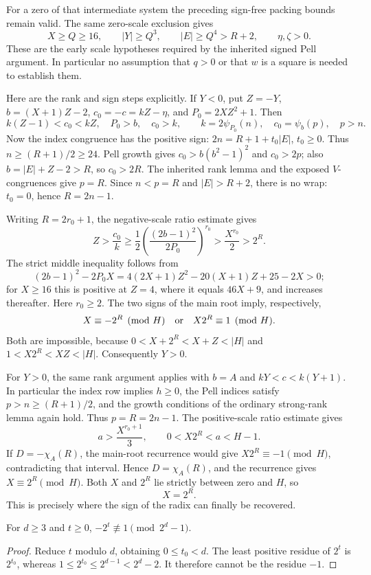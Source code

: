 For a zero of that intermediate system the preceding sign-free packing
bounds remain valid.  The same zero-scale exclusion gives
\[
 X\geq Q\geq16,\qquad |Y|\geq Q^3,\qquad
 |E|\geq Q^4>R+2,\qquad \eta,\zeta>0.
\]
These are the early scale hypotheses required by the inherited signed
Pell argument.  In particular no assumption that \(q>0\) or that
\(w\) is a square is needed to establish them.

Here are the rank and sign steps explicitly.  If \(Y<0\), put
\(Z=-Y\), \(b=(X+1)Z-2\), \(c_0=-c=kZ-\eta\), and
\(P_0=2XZ^2+1\).  Then
\[
 k(Z-1)<c_0<kZ,\quad P_0>b,\quad c_0>k,\qquad
 k=2\psi_{P_0}(n),\quad c_0=\psi_b(p),\quad p>n.
\]
Now the index congruence has the positive sign:
\(2n=R+1+t_0|E|\), \(t_0\geq0\).  Thus
\(n\geq(R+1)/2\geq24\).  Pell growth gives
\(c_0>b(b^2-1)^2\) and \(c_0>2p\); also
\(b=|E|+Z-2>R\), so \(c_0>2R\).
The inherited rank lemma and the exposed \(V\)-congruences give
\(p=R\).  Since \(n<p=R\) and \(|E|>R+2\), there is no wrap:
\(t_0=0\), hence \(R=2n-1\).

Writing \(R=2r_0+1\), the negative-scale ratio estimate gives
\[
 Z>\frac{c_0}{k}\geq
 \frac12\left(\frac{(2b-1)^2}{2P_0}\right)^{r_0}
 >\frac{X^{r_0}}2>2^R.
\]
The strict middle inequality follows from
\[
 (2b-1)^2-2P_0X
 =4(2X+1)Z^2-20(X+1)Z+25-2X>0;
\]
for \(X\geq16\) this is positive at \(Z=4\), where it equals
\(46X+9\), and increases thereafter.  Here \(r_0\geq2\).
The two signs of the main root imply, respectively,
\[
 X\equiv-2^R\pmod H
 \quad\hbox{or}\quad X2^R\equiv1\pmod H.
\]
Both are impossible, because
\(0<X+2^R<X+Z<|H|\) and \(1<X2^R<XZ<|H|\).
Consequently \(Y>0\).

For \(Y>0\), the same rank argument applies with \(b=A\) and
\(kY<c<k(Y+1)\).  In particular the index row implies \(h\geq0\),
the Pell indices satisfy \(p>n\geq(R+1)/2\), and the growth conditions
of the ordinary strong-rank lemma again hold.  Thus \(p=R=2n-1\).
The positive-scale ratio estimate gives
\[
 a>\frac{X^{r_0+1}}3,\qquad 0<X2^R<a<H-1.
\]
If \(D=-\chi_A(R)\), the main-root recurrence would give
\(X2^R\equiv-1\pmod H\), contradicting that interval.
Hence \(D=\chi_A(R)\), and the recurrence gives
\(X\equiv2^R\pmod H\).  Both \(X\) and \(2^R\) lie strictly
between zero and \(H\), so
\[
 \boxed{X=2^R.}
\]
This is precisely where the sign of the radix can finally be recovered.

\begin{lemma}
For \(d\geq3\) and \(t\geq0\),
\(-2^t\not\equiv1\pmod{2^d-1}\).
\end{lemma}
\begin{proof}
Reduce \(t\) modulo \(d\), obtaining \(0\leq t_0<d\).
The least positive residue of \(2^t\) is \(2^{t_0}\), whereas
\(1\leq2^{t_0}\leq2^{d-1}<2^d-2\).  It therefore cannot be the
residue \(-1\).
\end{proof}

